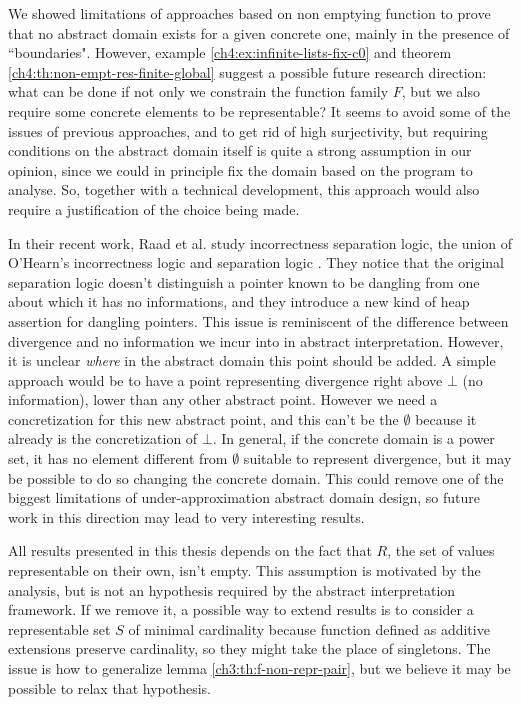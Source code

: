 We showed limitations of approaches based on non emptying function to prove that no abstract domain exists for a given concrete one, mainly in the presence of ``boundaries". However, example \ref{ch4:ex:infinite-lists-fix-c0} and theorem \ref{ch4:th:non-empt-res-finite-global} suggest a possible future research direction: what can be done if not only we constrain the function family $F$, but we also require some concrete elements to be representable? It seems to avoid some of the issues of previous approaches, and to get rid of high surjectivity, but requiring conditions on the abstract domain itself is quite a strong assumption in our opinion, since we could in principle fix the domain based on the program to analyse. So, together with a technical development, this approach would also require a justification of the choice being made.

In their recent work, Raad et al. \cite{incorrectness-separation-logic} study incorrectness separation logic, the union of O'Hearn's incorrectness logic and separation logic \cite{reynolds-incorrectness-logic}. They notice that the original separation logic doesn't distinguish a pointer known to be dangling from one about which it has no informations, and they introduce a new kind of heap assertion for dangling pointers. This issue is reminiscent of the difference between divergence and no information we incur into in abstract interpretation. However, it is unclear \textit{where} in the abstract domain this point should be added. A simple approach would be to have a point representing divergence right above $\bot$ (no information), lower than any other abstract point.
However we need a concretization for this new abstract point, and this can't be the $\emptyset$ because it already is the concretization of $\bot$. In general, if the concrete domain is a power set, it has no element different from $\emptyset$ suitable to represent divergence, but it may be possible to do so changing the concrete domain. This could remove one of the biggest limitations of under-approximation abstract domain design, so future work in this direction may lead to very interesting results.

All results presented in this thesis depends on the fact that $R$, the set of values representable on their own, isn't empty. This assumption is motivated by the analysis, but is not an hypothesis required by the abstract interpretation framework. If we remove it, a possible way to extend results is to consider a representable set $S$ of minimal cardinality because function defined as additive extensions preserve cardinality, so they might take the place of singletons. The issue is how to generalize lemma \ref{ch3:th:f-non-repr-pair}, but we believe it may be possible to relax that hypothesis.

